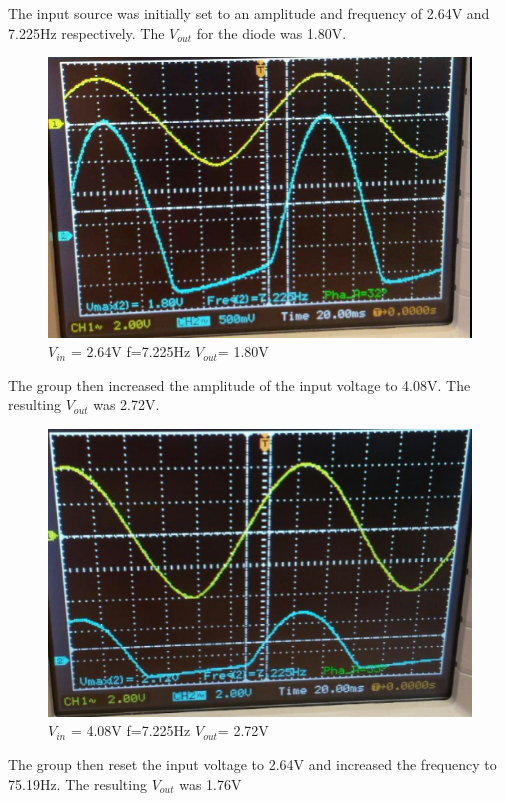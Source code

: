 \documentclass[twocolumn, amsmath]{revtex4}
\begin{document}
The input source was initially set to an amplitude and frequency of 2.64V and 7.225Hz respectively. The $V_{out}$ for the diode was 1.80V.

\begin{figure}
    \includegraphics[scale=0.3]{1800mV.png}  
    \caption{$V_{in}$ = 2.64V f=7.225Hz $V_{out}$= 1.80V}
\end{figure}


The group then increased the amplitude of the input voltage to 4.08V. The resulting $V_{out}$ was 2.72V.

\begin{figure}
    \includegraphics[scale=0.3]{2720mV.png}  
    \caption{$V_{in}$ = 4.08V f=7.225Hz $V_{out}$= 2.72V}
\end{figure}


The group then reset the input voltage to 2.64V and increased the frequency to 75.19Hz. The resulting $V_{out}$ was 1.76V
\end{document}
